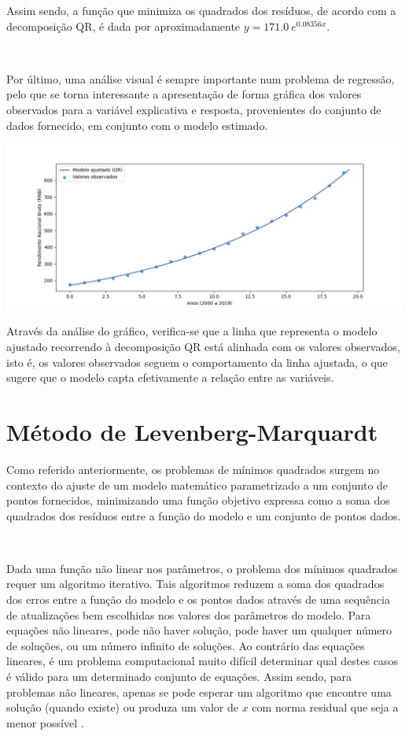 \documentclass[]{article}
\numberwithin{equation}{subsection}
\begin{document}
Assim sendo, a função que minimiza os quadrados dos resíduos, de acordo
com a decomposição QR, é dada por aproximadamente
\(y = 171.0\ e^{0.08356x}\).

\(\ \)

Por último, uma análise visual é sempre importante num problema de
regressão, pelo que se torna interessante a apresentação de forma
gráfica dos valores observados para a variável explicativa e resposta,
provenientes do conjunto de dados fornecido, em conjunto com o modelo
estimado.

\includegraphics[width=1\linewidth]{realidadevsQR}

Através da análise do gráfico, verifica-se que a linha que representa o
modelo ajustado recorrendo à decomposição QR está alinhada com os
valores observados, isto é, os valores observados seguem o comportamento
da linha ajustada, o que sugere que o modelo capta efetivamente a
relação entre as variáveis.

\newpage
\section{Método de Levenberg-Marquardt}

Como referido anteriormente, os problemas de mínimos quadrados surgem no
contexto do ajuste de um modelo matemático parametrizado a um conjunto
de pontos fornecidos, minimizando uma função objetivo expressa como a
soma dos quadrados dos resíduos entre a função do modelo e um conjunto
de pontos dados.

\(\ \)

Dada uma função não linear nos parâmetros, o problema dos mínimos
quadrados requer um algoritmo iterativo. Tais algoritmos reduzem a soma
dos quadrados dos erros entre a função do modelo e os pontos dados
através de uma sequência de atualizações bem escolhidas nos valores dos
parâmetros do modelo. Para equações não lineares, pode não haver
solução, pode haver um qualquer número de soluções, ou um número
infinito de soluções. Ao contrário das equações lineares, é um problema
computacional muito difícil determinar qual destes casos é válido para
um determinado conjunto de equações. Assim sendo, para problemas não
lineares, apenas se pode esperar um algoritmo que encontre uma solução
(quando existe) ou produza um valor de \(x\) com norma residual que seja
a menor possível \cite{SBLV18}.
\end{document}
